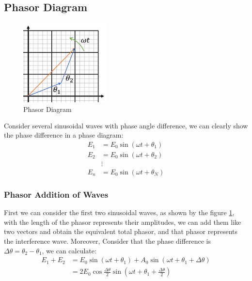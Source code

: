\documentclass[UTF8]{book}
\begin{document}
\subsection{Phasor Diagram}
\begin{figure}
  \vspace{-20pt}
  \begin{center}
    \includegraphics[width=0.4\textwidth]{Figure/Phasor_1.PNG}
  \end{center}  
  \vspace{-20pt}
  \caption{Phasor Diagram}
  \vspace{-40pt}
  \label{fig:Phasor Diagram1}
\end{figure}
Consider several sinusoidal waves with phase angle difference, we can clearly show the phase difference in a phase diagram:
\begin{align*}
E_1&=E_0\sin \left(\omega t+\theta _1\right)\\
E_2&=E_0\sin \left(\omega t+\theta _2\right)\\
&\vdots\\
E_n&=E_0\sin \left(\omega t+\theta _N\right)
\end{align*}


\subsubsection{Phasor Addition of Waves}
First we can consider the first two sinusoidal waves, as shown by the figure \ref{fig:Phasor Diagram1}, with the length of the phasor represents their amplitudes, we can add them like two vectors and obtain the equivalent total phasor, and that phasor represents the interference wave. Moreover, Consider that the phase difference is $\Delta \theta =\theta _2-\theta _1$, we can calculate:
\begin{align*}
E_1+E_2&=E_0\sin \left(\omega t+\theta _1\right)+A_0\sin \left(\omega t+\theta _1+\Delta \theta \right)\\
&=2E_0\cos \frac{\Delta \theta }{2}\sin \left(\omega t+\theta _1+\frac{\Delta \theta}{2}\right)
\end{align*}
\end{document}
